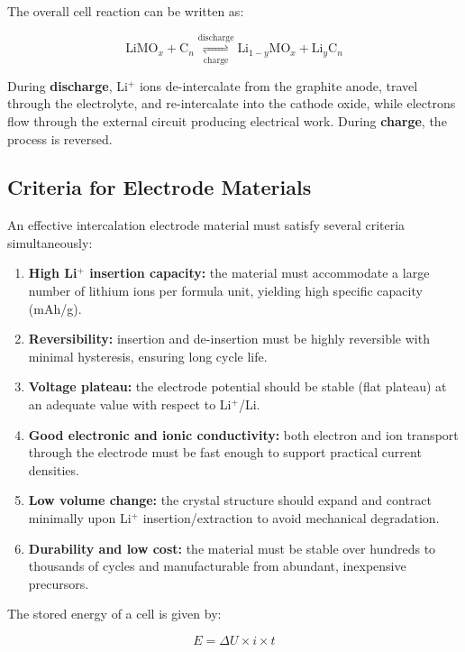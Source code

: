 The overall cell reaction can be written as:

\begin{equation}
    \text{LiMO}_x + \text{C}_n \underset{\text{charge}}{\stackrel{\text{discharge}}{\rightleftharpoons}} \text{Li}_{1-y}\text{MO}_x + \text{Li}_y\text{C}_n
\end{equation}

During \textbf{discharge}, Li$^+$ ions de-intercalate from the graphite anode, travel through the electrolyte, and re-intercalate into the cathode oxide, while electrons flow through the external circuit producing electrical work. During \textbf{charge}, the process is reversed.

\subsection{Criteria for Electrode Materials}

An effective intercalation electrode material must satisfy several criteria simultaneously:

\begin{enumerate}
    \item \textbf{High Li$^+$ insertion capacity:} the material must accommodate a large number of lithium ions per formula unit, yielding high specific capacity (mAh/g).
    \item \textbf{Reversibility:} insertion and de-insertion must be highly reversible with minimal hysteresis, ensuring long cycle life.
    \item \textbf{Voltage plateau:} the electrode potential should be stable (flat plateau) at an adequate value with respect to Li$^+$/Li.
    \item \textbf{Good electronic and ionic conductivity:} both electron and ion transport through the electrode must be fast enough to support practical current densities.
    \item \textbf{Low volume change:} the crystal structure should expand and contract minimally upon Li$^+$ insertion/extraction to avoid mechanical degradation.
    \item \textbf{Durability and low cost:} the material must be stable over hundreds to thousands of cycles and manufacturable from abundant, inexpensive precursors.
\end{enumerate}

The stored energy of a cell is given by:

\begin{equation}
    E = \Delta U \times i \times t
\end{equation}

